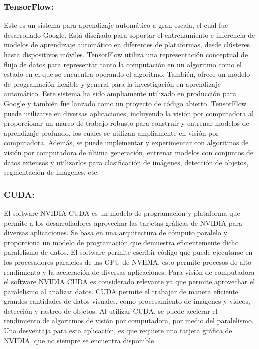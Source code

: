 \subsubsection*{TensorFlow:}

Este es un sistema para aprendizaje automático a gran escala, el cual fue desarrollado Google. Está diseñado para soportar el entrenamiento e inferencia de modelos de aprendizaje automático en diferentes de plataformas, desde clústeres hasta dispositivos móviles. TensorFlow utiliza una representación conceptual de flujo de datos para representar tanto la computación en un algoritmo como el estado en el que se encuentra operando el algoritmo. También, ofrece un modelo de programación flexible y general para la investigación en aprendizaje automático. Este sistema ha sido ampliamente utilizado en producción para Google y también fue lanzado como un proyecto de código abierto. TensorFlow puede utilizarse en diversas aplicaciones, incluyendo la visión por computadora al proporcionar un marco de trabajo robusto para construir y entrenar modelos de aprendizaje profundo, los cuales se utilizan ampliamente en visión por computadora. Además, se puede implementar y experimentar con algoritmos de visión por computadora de última generación, entrenar modelos con conjuntos de datos extensos y utilizarlos para clasificación de imágenes, detección de objetos, segmentación de imágenes, etc. \cite{articleTensor}


\subsubsection*{CUDA:}

El software NVIDIA CUDA es un modelo de programación y plataforma que permite a los desarrolladores aprovechar las tarjetas gráficas de NVIDIA para diversas aplicaciones. Se basa en una arquitectura de cómputo paralelo y proporciona un modelo de programación que demuestra eficientemente dicho paralelismo de datos. El software permite escribir código que puede ejecutarse en los procesadores paralelos de las GPU de NVIDIA, esto permite procesos de alto rendimiento y la aceleración de diversas aplicaciones. Para visión de computadora el software NVIDIA CUDA es considerado relevante ya que permite aprovechar el paralelismo al analizar datos. CUDA permite el trabajar de manera eficiente grandes cantidades de datos visuales, como procesamiento de imágenes y videos, detección y rastreo de objetos. Al utilizar CUDA, se puede acelerar el rendimiento de algoritmos de visión por computadora, por medio del paralelismo. Una desventaja para esta aplicación, es que requiere una tarjeta gráfica de NVIDIA, que no siempre se encuentra disponible. \cite{CUDA}

